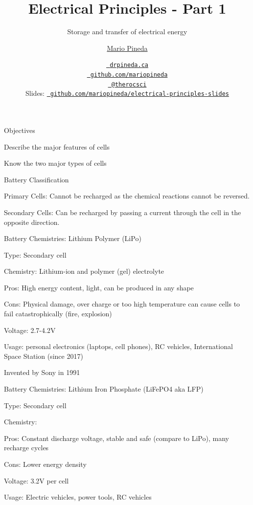 \documentclass[12pt,t]{beamer}
\title{Electrical Principles - Part 1}
\subtitle{Storage and transfer of electrical energy}
\author{\href{www.drpineda.ca}{Mario Pineda}}
\institute{Queen Elizabeth High School}
\date{\href{www.drpineda.ca}{\tt \scriptsize \color{foreground} drpineda.ca}
\\[-4pt]
\href{https://github.com/mariopineda}{\tt \scriptsize \color{foreground} github.com/mariopineda}
\\[-4pt]
\href{https://twitter.com/therocsci}{\tt \scriptsize \color{foreground} @therocsci}
\\[2pt]
\scriptsize {\lolit Slides:} \href{https://github.com/mariopineda/electrical-principles-slides}{\tt \scriptsize
  \color{foreground} github.com/mariopineda/electrical-principles-slides}
}
\begin{document}
{

\begin{frame}[c]{Objectives}
\bbi
\item Describe the major features of cells
\item Know the two major types of cells
\ei
\end{frame}

\begin{frame}[c]{Battery Classification}
\bbi
\item Primary Cells: Cannot be recharged as the chemical reactions cannot be reversed.
\item Secondary Cells: Can be recharged by passing a current through the cell in the opposite direction.
\ei
\end{frame}

\begin{frame}[c]{Battery Chemistries: Lithium Polymer (LiPo)}
\bbi
\item Type: Secondary cell
\item Chemistry: Lithium-ion and polymer (gel) electrolyte
\item Pros: High energy content, light, can be produced in any shape
\item Cons: Physical damage, over charge or too high temperature can cause cells to fail catastrophically (fire, explosion)
\item Voltage: 2.7-4.2V
\item Usage: personal electronics (laptops, cell phones), RC vehicles, International Space Station (since 2017)
\item Invented by Sony in 1991
\ei
\end{frame}

\begin{frame}[c]{Battery Chemistries: Lithium Iron Phosphate (LiFePO4 aka LFP)}
\bbi
\item Type: Secondary cell
\item Chemistry: 
\item Pros: Constant discharge voltage, stable and safe (compare to LiPo), many recharge cycles
\item Cons: Lower energy density 
\item Voltage: 3.2V per cell
\item Usage: Electric vehicles, power tools, RC vehicles
\ei
\end{frame}

}
\end{document}
